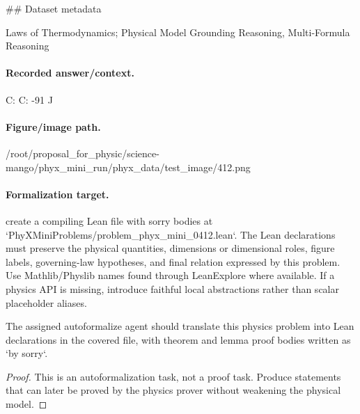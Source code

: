 \#\# Dataset metadata

Laws of Thermodynamics; Physical Model Grounding Reasoning, Multi-Formula Reasoning

\paragraph{Recorded answer/context.}
C: C: -91 J

\paragraph{Figure/image path.}
/root/proposal\_for\_physic/science-mango/phyx\_mini\_run/phyx\_data/test\_image/412.png

\paragraph{Formalization target.}
create a compiling Lean file with sorry bodies at `PhyXMiniProblems/problem\_phyx\_mini\_0412.lean`. The Lean declarations must preserve the physical quantities, dimensions or dimensional roles, figure labels, governing-law hypotheses, and final relation expressed by this problem.
Use Mathlib/Physlib names found through LeanExplore where available. If a physics API is missing, introduce faithful local abstractions rather than scalar placeholder aliases.

\begin{theorem}
\label{thm:physics:phyx_mini_0412:target}
The assigned autoformalize agent should translate this physics problem into Lean declarations in the covered file, with theorem and lemma proof bodies written as `by sorry`.
\end{theorem}
\begin{proof}
This is an autoformalization task, not a proof task. Produce statements that can later be proved by the physics prover without weakening the physical model.
\end{proof}

